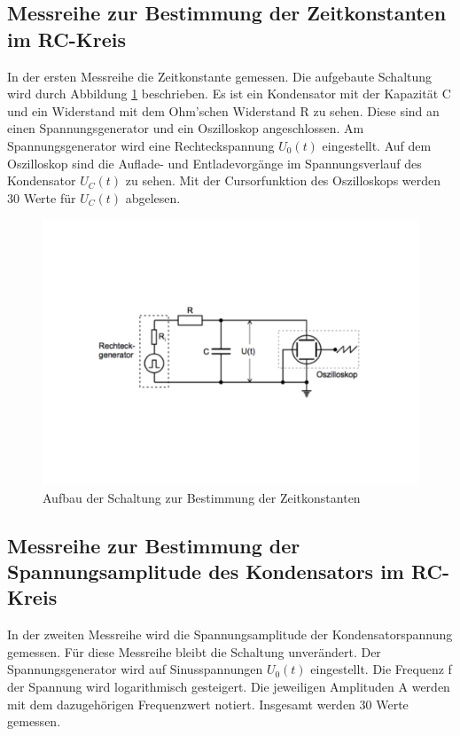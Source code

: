 \subsection{Messreihe zur Bestimmung der Zeitkonstanten im RC-Kreis}
In der ersten Messreihe die Zeitkonstante gemessen.
Die aufgebaute Schaltung wird durch Abbildung \ref{fig:Aufbau1} beschrieben.
Es ist ein Kondensator mit der Kapazität C und ein Widerstand mit dem Ohm'schen Widerstand R zu sehen.
Diese sind an einen Spannungsgenerator und ein Oszilloskop angeschlossen.
Am Spannungsgenerator wird eine Rechteckspannung $U_{0}(t)$ eingestellt.
Auf dem Oszilloskop sind die Auflade- und Entladevorgänge im Spannungsverlauf des Kondensator $U_{C}(t)$ zu sehen.
Mit der Cursorfunktion des Oszilloskops werden 30 Werte für $U_{C}(t)$ abgelesen.

\begin{figure}[h!]
  \centering
  \includegraphics[width=\textwidth]{Aufbau1.pdf}
  \caption{Aufbau der Schaltung zur Bestimmung der Zeitkonstanten \cite{1}}
  \label{fig:Aufbau1}
\end{figure}

\subsection{Messreihe zur Bestimmung der Spannungsamplitude des Kondensators im RC-Kreis}
In der zweiten Messreihe wird die Spannungsamplitude der Kondensatorspannung gemessen.
Für diese Messreihe bleibt die Schaltung unverändert.
Der Spannungsgenerator wird auf Sinusspannungen $U_{0}(t)$ eingestellt.
Die Frequenz f der Spannung wird logarithmisch gesteigert.
Die jeweiligen Amplituden A werden mit dem dazugehörigen Frequenzwert notiert.
Insgesamt werden 30 Werte gemessen.

